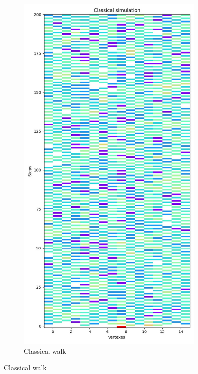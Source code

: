\begin{figure}[H]
  \centering
  \begin{subfigure}{.45\linewidth}
    \centering
    \includegraphics[width=\linewidth]{./figures/results/grid/classical.jpg}
    \caption{Classical walk}

\end{subfigure}
\end{figure}

